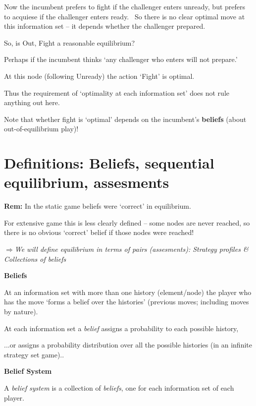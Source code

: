 \documentclass{article}
\begin{document}
\bigskip

Now the incumbent prefers to fight if the challenger enters unready, but
prefers to acquiese if the challenger enters ready. \ So there is no clear
optimal move at this information set -- it depends whether the challenger
prepared.

\bigskip

So, is Out, Fight a reasonable equilibrium?

Perhaps if the incumbent thinks `any challenger who enters will not prepare.'

At this node (following Unready) the action `Fight' is optimal.

Thus the requirement of `optimality at each information set' does not rule
anything out here.

\bigskip

Note that whether fight is `optimal' depends on the incumbent's \textbf{%
beliefs }(about out-of-equilibrium play)!

\bigskip

\section{Definitions: Beliefs, sequential equilibrium, assesments}

\textbf{Rem: }In the static game beliefs were `correct' in equilibrium.

For extensive game this is less clearly defined -- some nodes are never
reached, so there is no obvious `correct' belief if those nodes were reached!

\bigskip

$\mathbf{\Longrightarrow }$\textit{We will define equilibrium in terms of
pairs (assesments): Strategy profiles \& Collections of beliefs}

\bigskip

\textbf{Beliefs }

At an information set with more than one history (element/node) the player
who has the move `forms a belief over the histories' (previous moves;
including moves by nature).

At each information set a \textit{belief }assigns a probability to each
possible history,

...or assigns a probability distribution over all the possible histories (in
an infinite strategy set game)..

\bigskip

\textbf{Belief System}

A \textit{belief system }is a collection of \textit{beliefs}, one for each
information set of each player.
\end{document}
